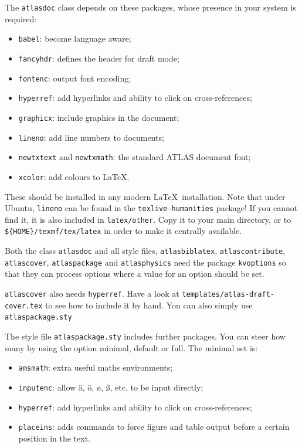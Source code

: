 \documentclass[atlasstyle,UKenglish]{latex/atlasdoc}
\newcommand{\File}[1]{\texttt{#1}\xspace}
\newcommand{\Option}[1]{\textsf{#1}\xspace}
\newcommand{\Package}[1]{\texttt{#1}\xspace}
\begin{document}
The \Package{atlasdoc} class depends on these packages, whose presence in
your system is required:
\begin{itemize}\setlength{\parskip}{0pt}\setlength{\itemsep}{0pt}
\item \Package{babel}: become language aware;
\item \Package{fancyhdr}: defines the header for draft mode;
\item \Package{fontenc}: output font encoding;
\item \Package{hyperref}: add hyperlinks and ability to click on cross-references;
\item \Package{graphicx}: include graphics in the document;
\item \Package{lineno}: add line numbers to documents;
\item \Package{newtxtext} and \Package{newtxmath}: the standard ATLAS document font;
\item \Package{xcolor}: add colours to \LaTeX.
\end{itemize}
These should be installed in any modern \LaTeX\ installation.
Note that under Ubuntu, \Package{lineno} can be found in the
\Package{texlive-humanities} package!
If you cannot find it, it is also included in \File{latex/other}.
Copy it to your main directory, or to \verb|${HOME}/texmf/tex/latex| in order to make
it centrally available.

Both the class \Package{atlasdoc} and all style files, 
\Package{atlasbiblatex}, \Package{atlascontribute}, \Package{atlascover}, \Package{atlaspackage} and \Package{atlasphysics}
need the package \Package{kvoptions} 
so that they can process options where a value for an option should be set.

\texttt{atlascover} also needs \texttt{hyperref}. 
Have a look at \texttt{templates/atlas-draft-cover.tex} to see how to include it by hand.
You can also simply use \texttt{atlaspackage.sty}

The style file \texttt{atlaspackage.sty} includes further packages.
You can steer how many by using the option \Option{minimal}, \Option{default} or \Option{full}.
The minimal set is:
\begin{itemize}\setlength{\parskip}{0pt}\setlength{\itemsep}{0pt}
\item \texttt{amsmath}: extra useful maths environments;
\item \texttt{inputenc}: allow ä, ö, ø, ß, etc. to be input directly;
\item \texttt{hyperref}: add hyperlinks and ability to click on cross-references;
\item \texttt{placeins}: adds commands to force figure and table output before a certain position in the text.
\end{itemize}
\end{document}
